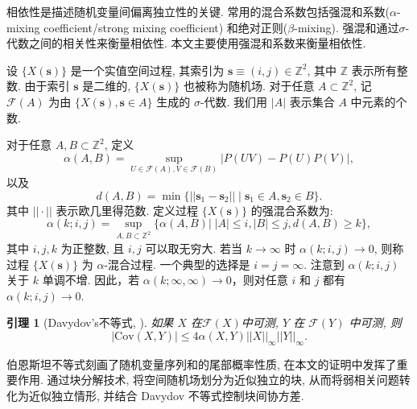 \documentclass[a4paper,openay,14pt]{ctexbook}
\numberwithin{equation}{section}
\numberwithin{lem}{section}
\newtheorem{lemma}[theorem]{引理}%
\begin{document}
相依性是描述随机变量间偏离独立性的关键. 常用的混合系数包括强混和系数($\alpha$-mixing coefficient/strong mixing coefficient) 和绝对正则($\beta$-mixing). 强混和通过$\sigma$-代数之间的相关性来衡量相依性. 本文主要使用强混和系数来衡量相依性.

设 $\{X(\mathbf{s})\}$ 是一个实值空间过程, 其索引为 $\mathbf{s} \equiv (i, j) \in \mathbb{Z}^2$, 其中 $\mathbb{Z}$ 表示所有整数. 由于索引 $\mathbf{s}$ 是二维的, $\{X(\mathbf{s})\}$ 也被称为随机场. 对于任意 $A \subset \mathbb{Z}^2$, 记 $\mathcal{F}(A)$ 为由 $\{X(\mathbf{s}), \mathbf{s} \in A\}$ 生成的 $\sigma$-代数. 我们用 $|A|$ 表示集合 $A$ 中元素的个数.

对于任意 $A, B \subset \mathbb{Z}^2$, 定义
\[
\alpha(A, B) = \sup_{U \in \mathcal{F}(A), V \in \mathcal{F}(B)} \big|P(UV) - P(U)P(V)\big|,
\]
以及
\[
d(A, B) = \min \{||\mathbf{s}_1 - \mathbf{s}_2|| \mid \mathbf{s}_1 \in A, \mathbf{s}_2 \in B\}.
\]
其中 $||\cdot||$ 表示欧几里得范数. 定义过程 $\{X(\mathbf{s})\}$ 的强混合系数为:
\[
\alpha(k; i, j) = \sup_{A,B \subset \mathbb{Z}^2} \{  \alpha(A, B)| \; |A| \leq i, |B| \leq j, d(A,B) \geq k\}, 
\]
其中 $i, j, k$ 为正整数, 且 $i, j$ 可以取无穷大. 若当 $k \to \infty$ 时 $\alpha(k; i, j) \to 0$, 则称过程 $\{X(\mathbf{s})\}$ 为 $\alpha$-混合过程. 一个典型的选择是 $i = j = \infty$. 注意到 $\alpha(k; i, j)$ 关于 $k$ 单调不增. 因此，若 $\alpha(k; \infty, \infty) \to 0$，则对任意 $i$ 和 $j$ 都有 $\alpha(k; i, j) \to 0$.


\begin{lemma}[Davydov's不等式, \cite{fazekas2003limit}]
如果 $X$ 在$\mathcal{F}(X)$中可测, $Y$ 在 $\mathcal{F}(Y)$ 中可测, 则
\[
| \mathrm{Cov} (X, Y)| \leq 4\alpha(X, Y)||X||_{\infty}||Y||_{\infty}.
\]
\end{lemma}

伯恩斯坦不等式刻画了随机变量序列和的尾部概率性质, 在本文的证明中发挥了重要作用. 通过块分解技术, 将空间随机场划分为近似独立的块, 从而将弱相关问题转化为近似独立情形, 并结合 Davydov 不等式控制块间协方差.


\end{document}
